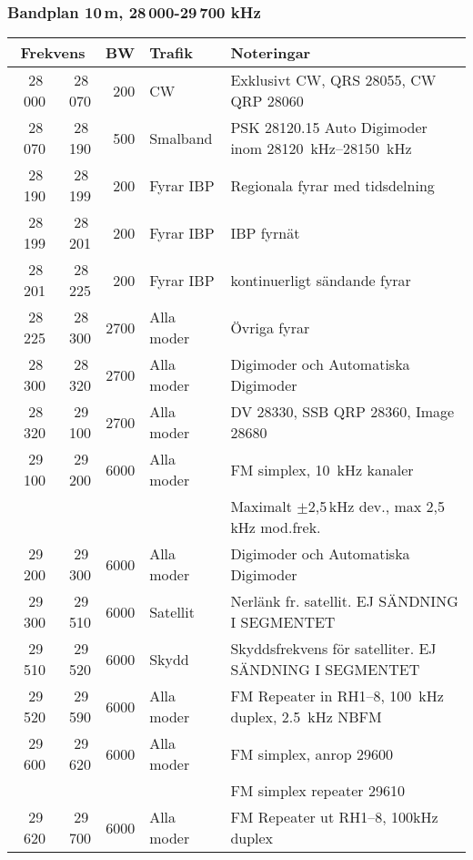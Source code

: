 \subsubsection{Bandplan 10\,m, 28\,000-29\,700 kHz}
\begin{tabular}{rrrll}
\multicolumn{2}{c}{\textbf{Frekvens}} & \textbf{BW} & \textbf{Trafik} & \textbf{Noteringar} \\ \hline

28\,000 & 28\,070 & 200  & CW         & Exklusivt CW, QRS \num{28055}, CW QRP \num{28060}                  \\ \hline
28\,070 & 28\,190 & 500  & Smalband   & PSK \num{28120,15} Auto Digimoder inom \SIrange{28120}{28150}{kHz} \\ \hline
28\,190 & 28\,199 & 200  & Fyrar IBP  & Regionala fyrar med tidsdelning                                    \\ \hline
28\,199 & 28\,201 & 200  & Fyrar IBP  & IBP fyrnät                                                         \\ \hline
28\,201 & 28\,225 & 200  & Fyrar IBP  & kontinuerligt sändande fyrar                                       \\ \hline
28\,225 & 28\,300 & 2700 & Alla moder & Övriga fyrar                                                       \\ \hline
28\,300 & 28\,320 & 2700 & Alla moder & Digimoder och Automatiska Digimoder                                \\ \hline
28\,320 & 29\,100 & 2700 & Alla moder & DV \num{28330}, SSB QRP \num{28360}, Image \num{28680}{}           \\
29\,100 & 29\,200 & 6000 & Alla moder & FM simplex, \SI{10}{kHz} kanaler                                   \\
        &         &      &            & Maximalt $\pm$2,5\,kHz dev., max 2,5\,kHz mod.frek.                \\ \hline
29\,200 & 29\,300 & 6000 & Alla moder & Digimoder och Automatiska Digimoder                                \\ \hline
29\,300 & 29\,510 & 6000 & Satellit   & Nerlänk fr. satellit. EJ SÄNDNING I SEGMENTET                      \\ \hline
29\,510 & 29\,520 & 6000 & Skydd      & Skyddsfrekvens för satelliter. EJ SÄNDNING I SEGMENTET             \\ \hline
29\,520 & 29\,590 & 6000 & Alla moder & FM Repeater in RH1--8, \SI{100}{kHz} duplex, \SI{2.5}{kHz} NBFM    \\ \hline
29\,600 & 29\,620 & 6000 & Alla moder & FM simplex, anrop \num{29600}                                      \\
        &         &      &            & FM simplex repeater \num{29610}                                    \\ \hline
29\,620 & 29\,700 & 6000 & Alla moder & FM Repeater ut RH1--8, \num{100}{kHz} duplex                       \\ \hline
\end{tabular}
\newpage

